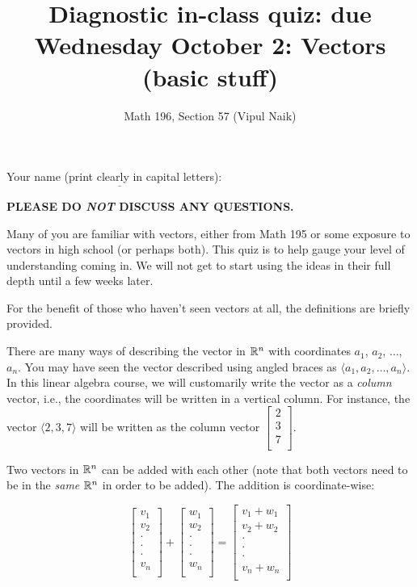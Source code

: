 \documentclass[10pt]{amsart}
\title{Diagnostic in-class quiz: due Wednesday October 2: Vectors (basic stuff)}
\author{Math 196, Section 57 (Vipul Naik)}
\begin{document}
\maketitle

Your name (print clearly in capital letters): $\underline{\qquad\qquad\qquad\qquad\qquad\qquad\qquad\qquad\qquad\qquad}$

{\bf PLEASE DO {\em NOT} DISCUSS ANY QUESTIONS.}

Many of you are familiar with vectors, either from Math 195 or some
exposure to vectors in high school (or perhaps both).  This quiz is to
help gauge your level of understanding coming in. We will not get to
start using the ideas in their full depth until a few weeks later.

For the benefit of those who haven't seen vectors at all, the
definitions are briefly provided.

There are many ways of describing the vector in $\mathbb{R}^n$ with
coordinates $a_1$, $a_2$, $\dots$, $a_n$. You may have seen the vector
described using angled braces as $\langle a_1,a_2,\dots,a_n
\rangle$. In this linear algebra course, we will customarily write the
vector as a {\em column} vector, i.e., the coordinates will be written
in a vertical column. For instance, the vector $\langle 2,3,7 \rangle$
will be written as the column vector $\left[\begin{matrix} 2 \\ 3 \\ 7
    \\\end{matrix}\right]$.

Two vectors in $\mathbb{R}^n$ can be added with each other (note that both
vectors need to be in the {\em same} $\mathbb{R}^n$ in order to be added). The
addition is coordinate-wise:

$$\left[\begin{matrix} v_1 \\ v_2 \\ \cdot \\ \cdot \\ \cdot \\ v_n \\\end{matrix}\right] + \left[\begin{matrix} w_1 \\ w_2 \\ \cdot \\ \cdot \\ \cdot \\ w_n \\\end{matrix}\right] = \left[\begin{matrix} v_1 + w_1 \\ v_2 + w_2 \\ \cdot \\ \cdot \\ \cdot \\ v_n + w_n \\\end{matrix}\right]$$
\end{document}
